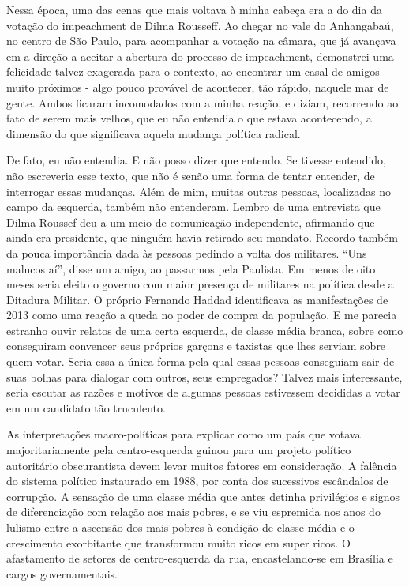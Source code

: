 Nessa época, uma das cenas que mais voltava à minha cabeça era a do dia
da votação do impeachment de Dilma Rousseff. Ao chegar no vale do
Anhangabaú, no centro de São Paulo, para acompanhar a votação na câmara,
que já avançava em a direção a aceitar a abertura do processo de
impeachment, demonstrei uma felicidade talvez exagerada para o contexto,
ao encontrar um casal de amigos muito próximos - algo pouco provável de
acontecer, tão rápido, naquele mar de gente. Ambos ficaram incomodados
com a minha reação, e diziam, recorrendo ao fato de serem mais velhos,
que eu não entendia o que estava acontecendo, a dimensão do que
significava aquela mudança política radical.

De fato, eu não entendia. E não posso dizer que entendo. Se tivesse
entendido, não escreveria esse texto, que não é senão uma forma de
tentar entender, de interrogar essas mudanças. Além de mim, muitas
outras pessoas, localizadas no campo da esquerda, também não entenderam.
Lembro de uma entrevista que Dilma Roussef deu a um meio de comunicação
independente, afirmando que ainda era presidente, que ninguém havia
retirado seu mandato. Recordo também da pouca importância dada às
pessoas pedindo a volta dos militares. ``Uns malucos aí'', disse um
amigo, ao passarmos pela Paulista. Em menos de oito meses seria eleito o
governo com maior presença de militares na política desde a Ditadura
Militar. O próprio Fernando Haddad identificava as manifestações de 2013
como uma reação a queda no poder de compra da população. E me parecia
estranho ouvir relatos de uma certa esquerda, de classe média branca,
sobre como conseguiram convencer seus próprios garçons e taxistas que
lhes serviam sobre quem votar. Seria essa a única forma pela qual essas
pessoas conseguiam sair de suas bolhas para dialogar com outros, seus
empregados? Talvez mais interessante, seria escutar as razões e motivos
de algumas pessoas estivessem decididas a votar em um candidato tão
truculento.

As interpretações macro-políticas para explicar como um país que votava
majoritariamente pela centro-esquerda guinou para um projeto político
autoritário obscurantista devem levar muitos fatores em consideração. A
falência do sistema político instaurado em 1988, por conta dos
sucessivos escândalos de corrupção. A sensação de uma classe média que
antes detinha privilégios e signos de diferenciação com relação aos mais
pobres, e se viu espremida nos anos do lulismo entre a ascensão dos mais
pobres à condição de classe média e o crescimento exorbitante que
transformou muito ricos em super ricos. O afastamento de setores de
centro-esquerda da rua, encastelando-se em Brasília e cargos
governamentais.

